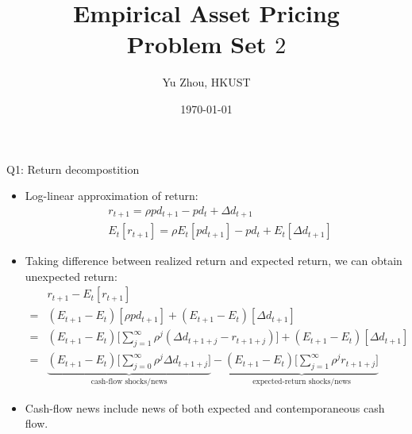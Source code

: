 \documentclass[10pt,t]{beamer}
\title{Empirical Asset Pricing \\ Problem Set $2$}
\author{Yu Zhou, HKUST}
\date{\today}
\begin{document}
\maketitle

\begin{frame}{Q1: Return decompostition}
\begin{itemize}
  \item Log-linear approximation of return:
  \begin{equation*}
  \begin{split}
  & r_{t+1} = \rho pd_{t+1} - pd_t + \Delta d_{t+1} \\
  & E_t[r_{t+1}] = \rho E_t[pd_{t+1}] - pd_t + E_{t}[\Delta d_{t+1}]
  \end{split}
  \end{equation*}
  \item Taking difference between realized return and expected return, we can obtain unexpected return:
  \begin{equation*}
  \begin{split}
  & r_{t+1} - E_t[r_{t+1}] \\
  = & (E_{t+1} - E_{t}) [\rho pd_{t+1}] + (E_{t+1} - E_{t}) [\Delta d_{t+1}] \\
  = & (E_{t+1} - E_{t}) \bigg[\sum_{j = 1}^{\infty} \rho^{j} (\Delta d_{t+1+j} - r_{t+1+j})\bigg] + (E_{t+1} - E_{t}) [\Delta d_{t+1}] \\
  = & \underbrace{(E_{t+1} - E_{t}) \bigg[\sum_{j = 0}^{\infty} \rho^{j} \Delta d_{t+1+j}\bigg]}_{\text{cash-flow shocks/news}} - \underbrace{(E_{t+1} - E_{t}) \bigg[\sum_{j = 1}^{\infty} \rho^{j} r_{t+1+j}\bigg]}_{\text{expected-return shocks/news}}
  \end{split}
  \end{equation*}
  \item Cash-flow news include news of both expected and contemporaneous cash flow.
\end{itemize}
\end{frame}
\end{document}
